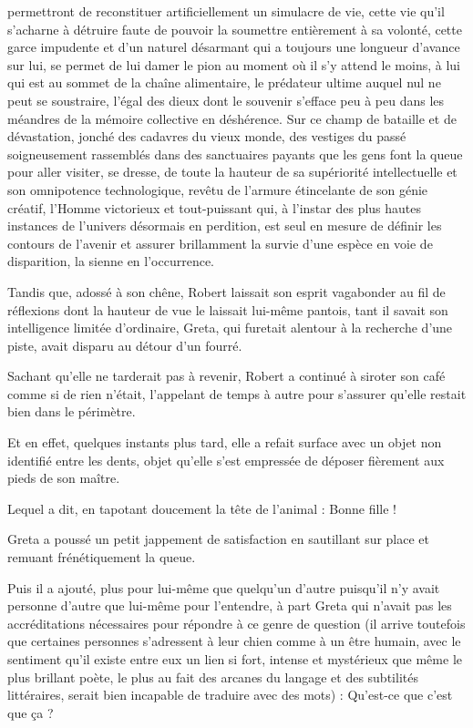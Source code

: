 % 
%
\noindent permettront de reconstituer artificiellement un simulacre de vie, cette vie qu’il s’acharne à détruire faute de pouvoir la soumettre entièrement à sa volonté, cette garce impudente et d’un naturel désarmant qui a toujours une longueur d’avance sur lui, se permet de lui damer le pion au moment où il s’y attend le moins, à lui qui est au sommet de la chaîne alimentaire, le prédateur ultime auquel nul ne peut se soustraire, l’égal des dieux dont le souvenir s’efface peu à peu dans les méandres de la mémoire collective en déshérence. Sur ce champ de bataille et de dévastation, jonché des cadavres du vieux monde, des vestiges du passé soigneusement rassemblés dans des sanctuaires payants que les gens font la queue pour aller visiter, se dresse, de toute la hauteur de sa supériorité intellectuelle et son omnipotence technologique, revêtu de l’armure étincelante de son génie créatif, l’Homme victorieux et tout-puissant qui, à l’instar des plus hautes instances de l’univers désormais en perdition, est seul en mesure de définir les contours de l’avenir et assurer brillamment la survie d’une espèce en voie de disparition, la sienne en l’occurrence.

Tandis que, adossé à son chêne, Robert laissait son esprit vagabonder au fil de réflexions dont la hauteur de vue le laissait lui-même pantois, tant il savait son intelligence limitée d’ordinaire, Greta, qui furetait alentour à la recherche d’une piste, avait disparu au détour d’un fourré.

Sachant qu’elle ne tarderait pas à revenir, Robert a continué à siroter son café comme si de rien n’était, l’appelant de temps à autre pour s’assurer qu’elle restait bien dans le périmètre.

Et en effet, quelques instants plus tard, elle a refait surface avec un objet non identifié entre les dents, objet qu’elle s’est empressée de déposer fièrement aux pieds de son maître.

Lequel a dit, en tapotant doucement la tête de l’animal : Bonne fille !

Greta a poussé un petit jappement de satisfaction en sautillant sur place et remuant frénétiquement la queue.

Puis il a ajouté, plus pour lui-même que quelqu’un d’autre puisqu’il n’y avait personne d’autre que lui-même pour l’entendre, à part Greta qui n’avait pas les accréditations nécessaires pour répondre à ce genre de question (il arrive toutefois que certaines personnes s’adressent à leur chien comme à un être humain, avec le sentiment qu’il existe entre eux un lien si fort, intense et mystérieux que même le plus brillant poète, le plus au fait des arcanes du langage et des subtilités littéraires, serait bien incapable de traduire avec des mots) : Qu’est-ce que c’est que ça ?

